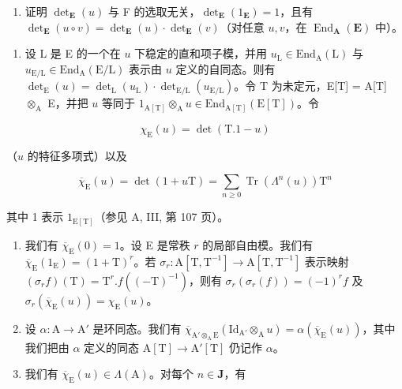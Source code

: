 \begin{enumerate}
\def\labelenumi{\alph{enumi})}
\tightlist
\item
  证明 \(\operatorname{det}_{\mathbf{E}}(u)\) 与 F 的选取无关，\(\operatorname{det}_{\mathbf{E}}(1_{\mathbf{E}}) = 1\)，且有 \(\operatorname{det}_{\mathbf{E}}(u \circ v) = \operatorname{det}_{\mathbf{E}}(u) \cdot \operatorname{det}_{\mathbf{E}}(v)\)（对任意 \(u, v\)，在 \(\operatorname{End}_{\mathbf{A}}(\mathbf{E})\) 中）。
\end{enumerate}
\relax{}
\begin{enumerate}
\def\labelenumi{\alph{enumi})}
\setcounter{enumi}{1}
\tightlist
\item
  设 L 是 E 的一个在 \(u\) 下稳定的直和项子模，并用 \(u_{\mathrm{L}} \in \mathrm{End}_{\mathrm{A}}(\mathrm{L})\) 与 \(u_{\mathrm{E/L}} \in \mathrm{End}_{\mathrm{A}}(\mathrm{E/L})\) 表示由 \(u\) 定义的自同态。则有 \(\det_{\mathrm{E}}(u) = \det_{\mathrm{L}}(u_{\mathrm{L}}) \cdot \det_{\mathrm{E/L}}(u_{\mathrm{E/L}})\)。令 T 为未定元，E{[}T{]} = A{[}T{]} \(\otimes_{\mathrm{A}}\) E，并把 \(u\) 等同于 \(1_{\mathrm{A[T]}} \otimes_{\mathrm{A}} u \in \mathrm{End}_{\mathrm{A[T]}}(\mathrm{E[T]})\)。令
\end{enumerate}

\[
\chi_ {\mathrm{E}} (u) = \det (\mathrm{T}. 1 - u)
\]

（\(u\) 的特征多项式）以及

\[
\overline {{{{\chi}}}} _ {\mathrm{E}} (u) = \det (1 + u \mathrm{T}) = \sum_ {n \geqslant 0} \operatorname{Tr} \left(\Lambda ^ {n} (u)\right) \mathrm{T} ^ {n}
\]

其中 1 表示 \(1_{\mathrm{E[T]}}\)（参见 A, III, 第 107 页）。

\begin{enumerate}
\def\labelenumi{\alph{enumi})}
\setcounter{enumi}{2}
\item
  我们有 \(\overline{\chi}_{\mathrm{E}}(0) = 1\)。设 E 是常秩 \(r\) 的局部自由模。我们有 \(\overline{\chi}_{\mathrm{E}}(1_{\mathrm{E}}) = (1 + \mathrm{T})^{r}\)。若 \(\sigma_r: \mathrm{A}[\mathrm{T}, \mathrm{T}^{-1}] \to \mathrm{A}[\mathrm{T}, \mathrm{T}^{-1}]\) 表示映射 \((\sigma_r f)(\mathrm{T}) = \mathrm{T}^r. f((- \mathrm{T})^{-1})\)，则有 \(\sigma_r(\sigma_r(f)) = (-1)^r f\) 及 \(\sigma_r(\overline{\chi}_{\mathrm{E}}(u)) = \chi_{\mathrm{E}}(u)\)。
\item
  设 \(\alpha: \mathrm{A} \to \mathrm{A}'\) 是环同态。我们有 \(\overline{\chi}_{\mathrm{A}'\otimes_{\mathrm{A}}\mathrm{E}}(\mathrm{Id}_{\mathrm{A}'} \otimes_{\mathrm{A}} u) = \alpha(\overline{\chi}_{\mathrm{E}}(u))\)，其中我们把由 \(\alpha\) 定义的同态 \(\mathrm{A}[\mathrm{T}] \to \mathrm{A}'[\mathrm{T}]\) 仍记作 \(\alpha\)。
\item
  我们有 \(\overline{\chi}_{\mathrm{E}}(u) \in \Lambda(\mathrm{A})\)。对每个 \(n \in \mathbf{J}\)，有
\end{enumerate}

